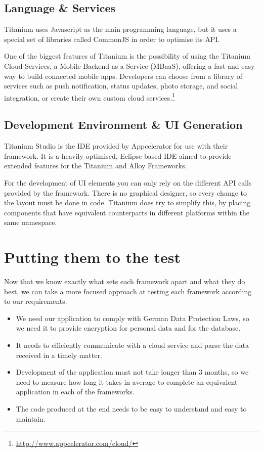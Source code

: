 \subsection{Language \& Services}
Titanium uses Javascript as the main programming language, but it uses a special set of libraries called CommonJS in order to optimise its \ac{API}.

One of the biggest features of Titanium is the possibility of using the Titanium Cloud Services, a Mobile Backend as a Service (MBaaS), offering a fast and easy way to build connected mobile apps. Developers can choose from a library of services such as push notification, status updates, photo storage, and social integration, or create their own custom cloud services.\footnote{\url{http://www.appcelerator.com/cloud/}} 



\subsection{Development Environment \& UI Generation}
Titanium  Studio is the \ac{IDE} provided by Appcelerator for use with their framework. It is a heavily optimised, Eclipse based \ac{IDE} aimed to provide extended features for the Titanium and Alloy Frameworks.

For the development of \ac{UI} elements you can only rely on the different \ac{API} calls provided by the framework. There is no graphical designer, so every change to the layout must be done in code. Titanium does try to simplify this, by placing components that have equivalent counterparts in different platforms within the same namespace.   



\section{Putting them to the test}
Now that we know exactly what sets each framework apart and what they do best, we can take a more focused approach at testing each framework according to our requirements.

\begin{itemize}
\item We need our application to comply with German Data Protection Laws, so we need it to provide encryption for personal data and for the database.
\item It needs to efficiently communicate with a cloud service and parse the data received in a timely matter.
\item Development of the application must not take longer than 3 months, so we need to measure how long it takes in average to complete an equivalent application in each of the frameworks.  
\item The code produced at the end needs to be easy to understand and easy to maintain.   
 
  
\end{itemize}




